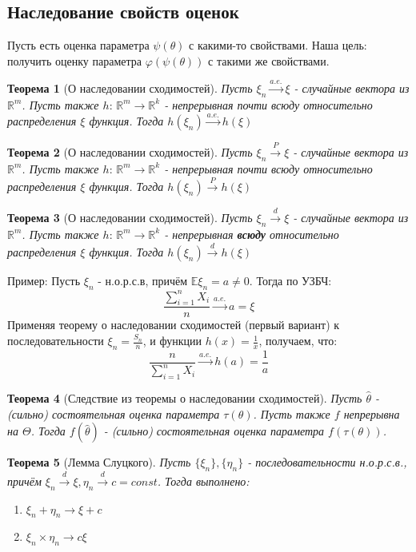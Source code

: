 \documentclass[a4paper,12pt]{article}
\newcommand{\expec}{\mathbb{E}}
\newcommand{\pconv}{\overset{P}{\to}}
\newcommand{\sconv}{\overset{a. e.}{\to}}
\newcommand{\dconv}{\overset{d}{\to}}
\newcommand{\sumin}{\sum\limits_{i=1}^n}
\newcommand{\R}{\mathbb{R}}
\theoremstyle{named}
\newtheorem*{namedtheorem}{Теорема}
\begin{document}
\subsection{Наследование свойств оценок}
Пусть есть оценка параметра $\psi(\theta)$ с какими-то свойствами. Наша цель: получить оценку параметра $\varphi(\psi(\theta))$
с такими же свойствами. 
\begin{namedtheorem}[О наследовании сходимостей]
    Пусть $\xi_n \sconv \xi$ - случайные вектора из $\R^m$. Пусть также $h: \, \R^m \to \R^k$ - непрерывная почти всюду 
    относительно распределения $\xi$ функция. Тогда $h(\xi_n) \sconv h(\xi)$
\end{namedtheorem}
\begin{namedtheorem}[О наследовании сходимостей]
    Пусть $\xi_n \pconv \xi$ - случайные вектора из $\R^m$. Пусть также $h: \, \R^m \to \R^k$ - непрерывная почти всюду 
    относительно распределения $\xi$ функция. Тогда $h(\xi_n) \pconv h(\xi)$
\end{namedtheorem}
\begin{namedtheorem}[О наследовании сходимостей]
    Пусть $\xi_n \dconv \xi$ - случайные вектора из $\R^m$. Пусть также $h: \, \R^m \to \R^k$ - непрерывная \textbf{всюду} 
    относительно распределения $\xi$ функция. Тогда $h(\xi_n) \dconv h(\xi)$
\end{namedtheorem}
Пример: Пусть $\xi_n$ - н.о.р.с.в, причём $\expec \xi_n = a\neq 0$. Тогда по УЗБЧ:
$$
    \frac{\sumin X_i}{n} \sconv a = \xi
$$
Применяя теорему о наследовании сходимостей (первый вариант) к последовательности $\xi_n = \frac{S_n}{n}$, и функции $h(x) = \frac{1}{x}$,
получаем, что:
$$
    \frac{n}{\sumin X_i} \sconv h(a) = \frac{1}{a}
$$
\begin{namedtheorem}[Следствие из теоремы о наследовании сходимостей]
    Пусть $\hat\theta$ - (сильно) состоятельная оценка параметра $\tau(\theta)$. Пусть также $f$ непрерывна на $\Theta$. 
    Тогда $f(\hat\theta)$ - (сильно) состоятельная оценка параметра $f(\tau(\theta))$.
\end{namedtheorem}
\begin{namedtheorem}[Лемма Слуцкого]
    Пусть $\{\xi_n\}, \{\eta_n\}$ - последовательности н.о.р.с.в., причём $\xi_n \dconv \xi, \eta_n\dconv c = const$. Тогда выполнено:
    \begin{enumerate}
        \item $\xi_n + \eta_n \to \xi + c$
        \item $\xi_n \times \eta_n \to c\xi$
    \end{enumerate}
\end{namedtheorem}
\end{document}
